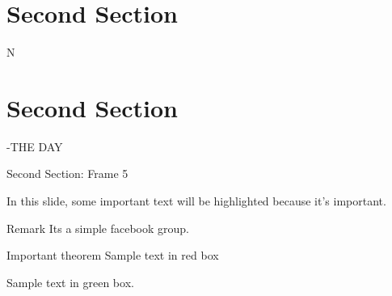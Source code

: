 \documentclass{beamer}
\begin{document}
\section{Second Section}
\begin{frame}
N
\end{frame}
\section{Second Section}
\begin{frame}
-THE DAY
\end{frame}
\begin{frame}{Second Section: Frame 5}

In this slide, some important text will be
\alert{highlighted} because it's important.

\begin{block}{Remark}
Its a simple facebook group.
\end{block}

\begin{alertblock}{Important theorem}
Sample text in red box
\end{alertblock}

\begin{examples}
Sample text in green box. 
\end{examples}
\end{frame}
\end{document}
